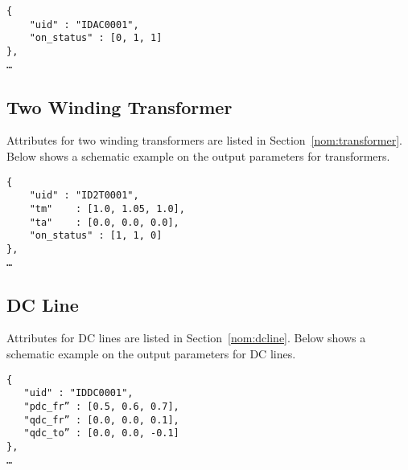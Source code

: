 \begin{verbatim}
{
    "uid" : "IDAC0001",
    "on_status" : [0, 1, 1]
},
…     
\end{verbatim}


\label{sec:output_2wtransformer}
\subsection{Two Winding Transformer}
Attributes for two winding transformers are listed in Section~\ref{nom:transformer}.
Below shows a schematic example on the output parameters for transformers.

\begin{verbatim}
{
    "uid" : "ID2T0001",
    "tm"    : [1.0, 1.05, 1.0],
    "ta"    : [0.0, 0.0, 0.0],
    "on_status" : [1, 1, 0]
},
…     
\end{verbatim}

\label{sec:output_dcline}
\subsection{DC Line}
Attributes for DC lines are listed in Section~\ref{nom:dcline}.
Below shows a schematic example on the output parameters for DC lines.
\begin{verbatim}
{
   "uid" : "IDDC0001",
   "pdc_fr” : [0.5, 0.6, 0.7],
   "qdc_fr” : [0.0, 0.0, 0.1],
   "qdc_to” : [0.0, 0.0, -0.1]
},
…    
\end{verbatim}





